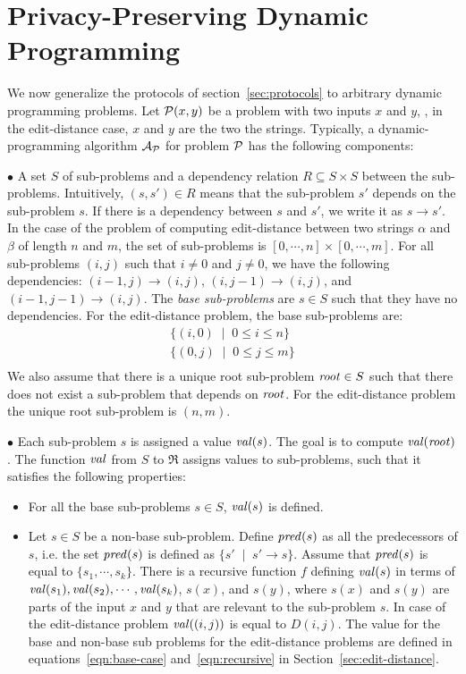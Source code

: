 \section{Privacy-Preserving Dynamic Programming}

We now generalize the protocols of section~\ref{sec:protocols} to
arbitrary dynamic programming problems.  Let ${\cal P}(x,y)$ be a problem
with two inputs $x$ and $y$, \eg, in the edit-distance case, $x$ and
$y$ are the two the strings. Typically, a dynamic-programming algorithm
${\cal A}_{\cal P}$ for problem ${\cal P}$ has the following components:

\noindent
$\bullet$ A set $S$ of sub-problems and a dependency relation $R \subseteq S \times S$ between the
sub-problems. Intuitively, $(s,s') \in R$ means that the sub-problem $s'$ depends on the sub-problem $s$.
If there is a dependency between $s$ and $s'$, we write it as $s \rightarrow s'$.
In the case of the problem of computing edit-distance between two strings $\alpha$ and $\beta$
of length $n$ and $m$, the set of sub-problems is $[0,\cdots,n] \times [0,\cdots,m]$. For all sub-problems
$(i,j)$ such that $i \not= 0$ and $j \not=0$, we have the following dependencies: 
$(i-1,j) \rightarrow (i,j)$, $(i,j-1) \rightarrow (i,j)$, and $(i-1,j-1) \rightarrow (i,j)$.
The {\it base sub-problems} are $s \in S$ such that they have no dependencies. For the edit-distance
problem, the base sub-problems are: 
\[
\begin{array}{l}
\{ (i,0) \; \mid \;  0 \leq i \leq n \} \\
\{ (0,j) \; \mid \;  0 \leq j \leq m \} \\
\end{array}
\]
We also assume that there is a unique root sub-problem ${\it root} \in S$ such that there does not
exist a sub-problem that depends on ${\it root}$. For the edit-distance problem the unique root
sub-problem is $(n,m)$. 

\noindent
$\bullet$ Each sub-problem $s$ is assigned a value ${\it val}(s)$. The goal is to compute 
${\it val}({\it root})$.  The function ${\it val}$ from $S$ to
$\Re$ assigns values to sub-problems, such that it satisfies the following properties:
\begin{itemize}
\item For all the base sub-problems $s \in S$, ${\it val}(s)$ is defined.
\item Let $s \in S$ be a non-base sub-problem. Define ${\it pred}(s)$ as all the predecessors
of $s$, i.e. the set ${\it pred}(s)$ is defined as $\{ s' \; \mid \;
s' \rightarrow s \}$.  Assume that ${\it pred}(s)$ is equal to $\{ s_1
, \cdots, s_k \}$.  There is a recursive function $f$ defining ${\it
val}(s)$ in terms of ${\it val}(s_1), {\it val}(s_2), \cdots , {\it
val}(s_k)$, $s(x)$, and $s(y)$, where $s(x)$ and $s(y)$ are parts of
the input $x$ and $y$ that are relevant to the sub-problem $s$. In
case of the edit-distance problem ${\it val} ((i,j))$ is equal to
$D(i,j)$. The value for the base and non-base sub problems for the
edit-distance problems are defined in equations~\ref{eqn:base-case}
and~\ref{eqn:recursive} in Section~\ref{sec:edit-distance}.
\end{itemize}



